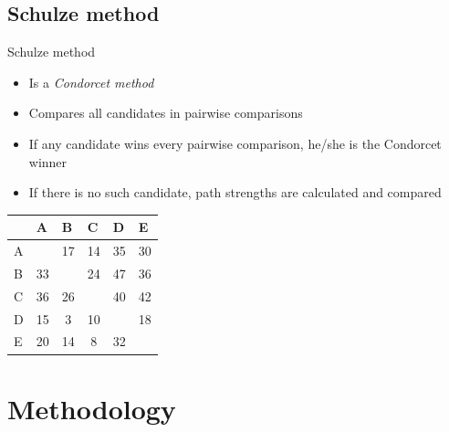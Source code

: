\documentclass[xcolor=table]{beamer}
\begin{document}
\subsection{Schulze method}
\begin{frame}{Schulze method}
\begin{itemize}
    \item Is a \textit{Condorcet method}
    \item Compares all candidates in pairwise comparisons
    \item If any candidate wins every pairwise comparison, he/she is the Condorcet winner
    \item If there is no such candidate, path strengths are calculated and compared
\end{itemize}
\begin{table}
\centering
\begin{tabular}{l|c|c|c|c|c|}
\cline{2-6}
 & \multicolumn{1}{l|}{A} & \multicolumn{1}{l|}{B} & \multicolumn{1}{l|}{C} & \multicolumn{1}{l|}{D} & \multicolumn{1}{l|}{E} \\ \hline
\multicolumn{1}{|l|}{A} & \cellcolor[HTML]{9B9B9B} & \cellcolor[HTML]{FFDDDD}17 & \cellcolor[HTML]{FFDDDD}14 & \cellcolor[HTML]{DDFFDD}35 & \cellcolor[HTML]{DDFFDD}30 \\ \hline
\multicolumn{1}{|l|}{B} & \cellcolor[HTML]{DDFFDD}33 & \cellcolor[HTML]{9B9B9B} & \cellcolor[HTML]{FFDDDD}24 & \cellcolor[HTML]{DDFFDD}47 & \cellcolor[HTML]{DDFFDD}36 \\ \hline
\multicolumn{1}{|l|}{C} & \cellcolor[HTML]{DDFFDD}36 & \cellcolor[HTML]{DDFFDD}26 & \cellcolor[HTML]{9B9B9B} & \cellcolor[HTML]{DDFFDD}40 & \cellcolor[HTML]{DDFFDD}42 \\ \hline
\multicolumn{1}{|l|}{D} & \cellcolor[HTML]{FFDDDD}15 & \cellcolor[HTML]{FFDDDD}3 & \cellcolor[HTML]{FFDDDD}10 & \cellcolor[HTML]{9B9B9B} & \cellcolor[HTML]{FFDDDD}18 \\ \hline
\multicolumn{1}{|l|}{E} & \cellcolor[HTML]{FFDDDD}20 & \cellcolor[HTML]{FFDDDD}14 & \cellcolor[HTML]{FFDDDD}8 & \cellcolor[HTML]{DDFFDD}32 & \cellcolor[HTML]{9B9B9B} \\ \hline
\end{tabular}
\end{table}
\end{frame}

\section{Methodology}
\end{document}

